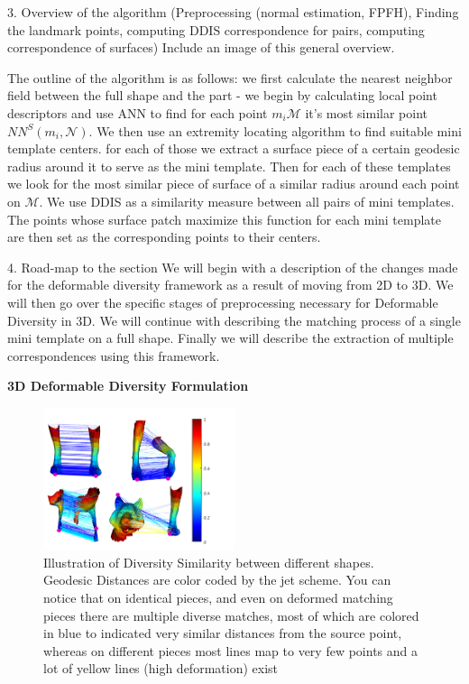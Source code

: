 \documentclass[10pt,twocolumn,letterpaper]{article}
\begin{document}
{\color{red} 	3. Overview of the algorithm (Preprocessing (normal estimation, FPFH), Finding the landmark points, computing DDIS correspondence for pairs, computing correspondence of surfaces)
	Include an image of this general overview.}

The outline of the algorithm is as follows: we first calculate the nearest neighbor field between the full shape and the part - we begin by calculating local point descriptors and use ANN to find for each point $m_i \mathcal{M}$ it's most similar point $NN^S(m_i,\mathcal{N})$. We then use an extremity locating algorithm to find suitable mini template centers. for each of those we extract a surface piece of a certain geodesic radius around it to serve as the mini template. Then for each of these templates we look for the most similar piece of surface of a similar radius around each point on $\mathcal{M}$. We use DDIS as a similarity measure between all pairs of mini templates. The points whose surface patch maximize this function for each mini template are then set as the corresponding points to their centers.

{\color{red}
	4. Road-map to the section
}
We will begin with a description of the changes made for the deformable diversity framework as a result of moving from 2D to 3D. We will then go over the specific stages of preprocessing necessary for Deformable Diversity in 3D. We will continue with describing the matching process of a single mini template on a full shape. Finally we will describe the extraction of multiple correspondences using this framework.


\textbf{3D Deformable Diversity Formulation}
\begin{figure}[htb]
	
	\includegraphics[width=0.5\textwidth]{figures/DDIS2.png}
	\caption{Illustration of Diversity Similarity between different shapes. 
		Geodesic Distances are color coded by the jet scheme. 
		You can notice that on identical pieces, and even on deformed matching pieces there are multiple diverse matches, most of which are colored in blue to indicated very similar distances from the source point, whereas on different pieces most lines map to very few points and a lot of yellow lines (high deformation) exist}
\end{figure}
\end{document}
